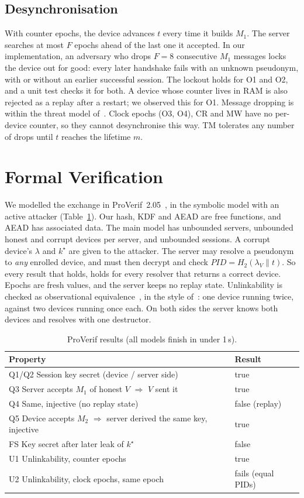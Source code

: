 \subsection{Desynchronisation}
With counter epochs, the device advances $t$ every time it builds $M_1$. The server searches at most $F$ epochs ahead of
the last one it accepted. In our implementation, an adversary who drops $F=8$ consecutive $M_1$ messages locks the device
out for good: every later handshake fails with an unknown pseudonym, with or without an earlier successful session. The
lockout holds for O1 and O2, and a unit test checks it for both. A device whose counter lives in RAM is also rejected as
a replay after a restart; we observed this for O1. Message dropping is within the threat model of~\cite{base}. Clock epochs (O3, O4), CR and MW have no
per-device counter, so they cannot desynchronise this way. TM tolerates any number of drops until $t$ reaches the
lifetime $m$.

\iffv
\section{Formal Verification}\label{sec:fv}
We modelled the exchange in ProVerif~2.05~\cite{proverif}, in the symbolic model with an active attacker
(Table~\ref{tab:fv}). Our hash, KDF and AEAD are free functions, and AEAD has associated data. The main model has
unbounded servers, unbounded honest and corrupt devices per server, and unbounded sessions. A corrupt device's $\lambda$
and $k^\star$ are given to the attacker. The server may resolve a pseudonym to \emph{any} enrolled device, and must then
decrypt and check $PID=H_2(\lambda_V\|t)$. So every result that holds, holds for every resolver that returns a correct
device. Epochs are fresh values, and the server keeps no replay state. Unlinkability is checked as observational
equivalence~\cite{blanchet08}, in the style of~\cite{arapinis}: one device running twice, against two devices running
once each. On both sides the server knows both devices and resolves with one destructor.

\begin{table}[t]
\centering
\caption{ProVerif results (all models finish in under 1\,s).}
\label{tab:fv}
\footnotesize
\begin{tabular}{@{}p{5.0cm}l@{}}
\toprule
Property & Result \\
\midrule
Q1/Q2 Session key secret (device / server side) & true \\
Q3 Server accepts $M_1$ of honest $V$ $\Rightarrow$ $V$ sent it & true \\
Q4 Same, injective (no replay state) & false (replay) \\
Q5 Device accepts $M_2$ $\Rightarrow$ server derived the same key, injective & true \\
FS Key secret after later leak of $k^\star$ & false \\
U1 Unlinkability, counter epochs & true \\
U2 Unlinkability, clock epochs, same epoch & fails (equal PIDs) \\
\bottomrule
\end{tabular}
\end{table}

